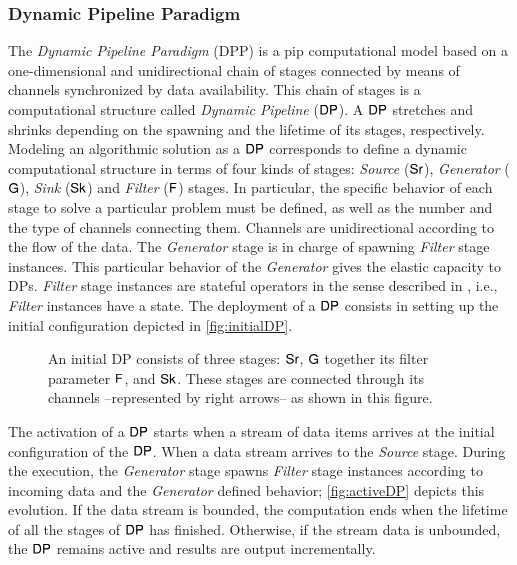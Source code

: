 \subsubsection{Dynamic Pipeline Paradigm}\label{sec:dp}
The \textit{Dynamic Pipeline Paradigm} (DPP) \cite{dpdef} is a \acrshort{pip} computational model based on a one-dimensional and unidirectional chain of stages connected by means of channels synchronized by data availability. 
This chain of stages is a computational structure called \textit{Dynamic Pipeline} ($\mathsf{DP}$). A $\mathsf{DP}$ stretches and shrinks depending on the spawning and the lifetime of its stages, respectively. Modeling an algorithmic 
solution as a $\mathsf{DP}$ corresponds to define a dynamic computational structure in terms of four kinds of stages: \textit{Source} ($\mathsf{Sr}$), \textit{Generator} ($\mathsf{G}$), \textit{Sink} ($\mathsf{Sk}$) and \textit{Filter} ($\mathsf{F}$) stages. 
In particular, the specific behavior of each stage to solve a particular problem must be defined, as well as the number and the type of channels connecting them. Channels are unidirectional according to the flow of the data. 
The \textit{Generator} stage is in charge of spawning \textit{Filter} stage instances. This particular behavior of the \textit{Generator} gives the elastic capacity to DPs. \textit{Filter} stage instances are stateful operators in the 
sense described in \cite{hr19}, i.e., \textit{Filter} instances have a state.  
The deployment of a $\mathsf{DP}$ consists in setting up the initial configuration depicted in \autoref{fig:initialDP}. 
\begin{figure}[h]
\centering
{}
\caption[{[Pre] Initial configuration of a DP}]{ An initial DP consists of three stages: $\mathsf{Sr}$, $\mathsf{G}$ together its filter parameter $\mathsf{F}$, and $\mathsf{Sk}$. These stages are connected through its channels --represented by right arrows-- as shown in this figure.}
\label{fig:initialDP}
\end{figure}
The activation of a $\mathsf{DP}$ starts when a stream of data items arrives at the initial configuration of the $\mathsf{DP}$. 
When a data stream arrives to the \textit{Source} stage. During the execution, the \textit{Generator} stage spawns \textit{Filter} stage instances according to incoming data and the \textit{Generator} defined behavior; \autoref{fig:activeDP} depicts this evolution. 
If the data stream is bounded, the computation ends when the lifetime of all the stages of $\mathsf{DP}$ has finished. Otherwise, if the stream data is unbounded, 
the $\mathsf{DP}$ remains active and results are output incrementally. 


